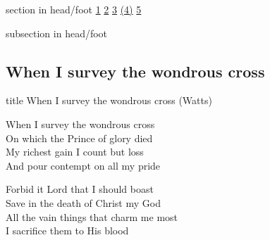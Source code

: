 \documentclass{beamer}
\begin{document}
{
{ 
 {
 \begin{beamercolorbox}[ht=4.5ex,dp=1.5ex,%
      leftskip=.3cm,rightskip=.3cm plus1fil]{section in head/foot}
 \fontsize{12}{25}\selectfont 
\hyperlink{When I survey the wondrous cross[](Watts)1}{1}
\hyperlink{When I survey the wondrous cross[](Watts)2}{2}
\hyperlink{When I survey the wondrous cross[](Watts)3}{3}
\hyperlink{When I survey the wondrous cross[](Watts)(4)}{(4)}
\hyperlink{When I survey the wondrous cross[](Watts)5}{5}
 
 \end{beamercolorbox}%
  \begin{beamercolorbox}[ht=2.5ex,dp=1.125ex,%
   leftskip=.3cm,rightskip=.3cm plus1fil]{subsection in head/foot}
   \insertauthor
 \end{beamercolorbox}%
 }
}
\subsection{ When I survey the wondrous cross }

\hypertarget{When I survey the wondrous cross[](Watts)}{}
\begin{frame}{}
 \vfill
  \centering
  \begin{beamercolorbox}[sep=8pt,center,shadow=true,rounded=true]{title}
    When I survey the wondrous cross (Watts)    
  \end{beamercolorbox}
  \vfill
\end{frame}

\hypertarget{When I survey the wondrous cross[](Watts)1}{}
\begin{frame}{}
\fontsize{ 18 }{ 23 }\selectfont

When I survey the wondrous cross\\ 
On which the Prince of glory died\\ 
My richest gain I count but loss\\ 
And pour contempt on all my pride 

\end{frame}

\hypertarget{When I survey the wondrous cross[](Watts)2}{}
\begin{frame}{}
\fontsize{ 18 }{ 23 }\selectfont

Forbid it Lord that I should boast\\ 
Save in the death of Christ my God\\ 
All the vain things that charm me most\\ 
I sacrifice them to His blood 


\end{frame}}
\end{document}
